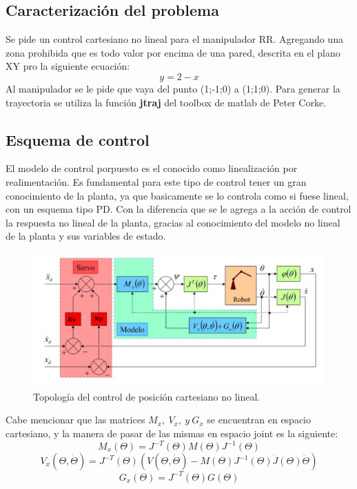 %

%

\subsection{Caracterizaci\'on del problema}
Se pide un control cartesiano no lineal para el manipulador RR. Agregando una zona prohibida que es todo valor por encima de una pared, descrita en el plano XY pro la siguiente ecuaci\'on:
\begin{equation}
y=2-x
\end{equation}
Al manipulador se le pide que vaya del punto (1;-1;0) a (1;1;0). Para generar la trayectoria se utiliza la función \textbf{jtraj} del toolbox de matlab de Peter Corke.
\subsection{Esquema de control}
El modelo de control porpuesto es el conocido como linealizaci\'on por realimentaci\'on.
Es fundamental para este tipo de control tener un gran conocimiento de la planta, ya que basicamente se lo controla como si fuese lineal, con un esquema tipo PD. Con la diferencia que se le agrega  a la acci\'on de control la respuesta no lineal de la planta, gracias al conocimiento del modelo no lineal de la planta y sus variables de estado.
\begin{figure}[H]
	\centering
	\includegraphics[width=0.8\linewidth]{ImagenesControl de posición no lineal/modelo_control_p}
	\caption{Topolog\'ia del control de posici\'on cartesiano no lineal.}	
	\label{fig:control_p_modelo}
\end{figure}
Cabe mencionar que las matrices $M_x,\ V_x, \ y \ G_x$ se encuentran en espacio cartesiano, y la manera de pasar de las mismas en espacio joint es la siguiente:
\begin{equation}
M_x(\Theta) = J^{-T}(\Theta) M(\Theta) J^{-1}(\Theta)
\end{equation} 
\begin{equation}
V_x(\Theta , \dot{\Theta}) = J^{-T}(\Theta) \left( V(\Theta , \dot{\Theta}) - M(\Theta) J^{-1}(\Theta) \dot{J}(\Theta) \dot{\Theta} \right)
\end{equation} 
\begin{equation}
G_x(\Theta) = J^{-T}(\Theta) G(\Theta) 
\end{equation}



